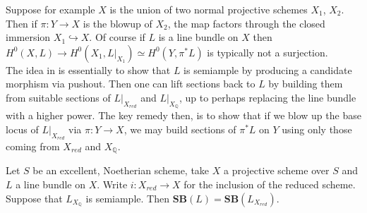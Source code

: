\documentclass[a4paper,12pt]{book}
\newcommand{\SB}{\mathbf{SB}}
\begin{document}
Suppose for example $X$ is the union of two normal projective schemes $X_{1}$, $X_{2}$. Then if $\pi:Y \to X$ is the blowup of $X_{2}$, the map factors through the closed immersion $X_{1} \hookrightarrow X$. Of course if $L$ is a line bundle on $X$ then $H^{0}(X,L) \to H^{0}(X_{1},L|_{X_{1}})\simeq H^{0}(Y,\pi^{*}L)$ is typically not a surjection.\\

 The idea in \cite[Thereom 1.10]{witaszek2020keels} is essentially to show that $L$ is semiample by producing a candidate morphism via pushout. Then one can lift sections back to $L$ by building them from suitable sections of $L|_{X_{red}}$ and $L|_{X_{\mathbb{Q}}}$, up to perhaps replacing the line bundle with a higher power. The key remedy then, is to show that if we blow up the base locus of $L|_{X_{red}}$ via $\pi:Y \to X$, we may build sections of $\pi^{*}L$ on $Y$ using only those coming from $X_{red}$ and $X_{\mathbb{Q}}$.\\

\begin{theorem}\label{BaseRed}
		Let $S$ be an excellent, Noetherian scheme, take $X$ a projective scheme over $S$ and $L$ a line bundle on $X$. Write $i:X_{red} \to X$ for the inclusion of the reduced scheme. Suppose that $L_{X_{\mathbb{Q}}}$ is semiample. Then $\SB(L)=\SB(L_{X_{red}})$.
\end{theorem}
\end{document}
